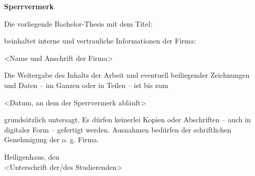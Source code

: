 %
\vspace*{10ex}

\begin{center}
\huge{\textbf{Sperrvermerk}}
\end{center}

\bigskip 


Die vorliegende Bachelor-Thesis mit dem Titel:

\begin{center}
\thetitle
\end{center}

beinhaltet interne und vertrauliche Informationen der Firma:

<Name und Anschrift der Firma>

Die Weitergabe des Inhalts der Arbeit und eventuell beiliegender Zeichnungen und Daten – im Ganzen oder in Teilen – ist bis zum 

<Datum, an dem der Sperrvermerk abläuft> 

grundsätzlich untersagt. Es dürfen keinerlei Kopien oder Abschriften – auch in digitaler Form – gefertigt werden.
Ausnahmen bedürfen der schriftlichen Genehmigung der o. g. Firma.
\bigskip 


Heiligenhaus, den 
%
\underline{\hspace*{2cm}} 
\underline{\hspace*{7cm}}\\
\hspace*{5.5cm}
<Unterschrift der/des Studierenden>
